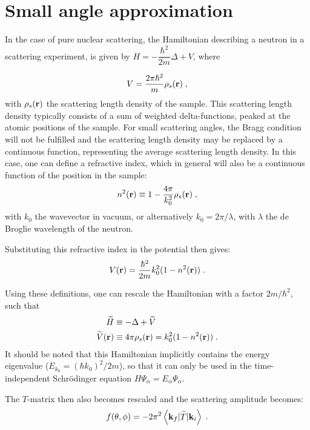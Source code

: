 \section{Small angle approximation}

In the case of pure nuclear scattering, the Hamiltonian describing a neutron in a scattering experiment, is given by $H = -\dfrac{\hbar^2}{2m}\Delta + V$, where

\begin{equation*}
  V = \frac{2\pi \hbar^2}{m}\rho_s(\mathbf{r}) \; ,
\end{equation*}
with $\rho_s(\mathbf{r})$ the scattering length density of the sample. This scattering length density typically consists of a sum of weighted delta-functions, peaked at the atomic positions of the sample. For small scattering angles, the Bragg condition will not be fulfilled and the scattering length density may be replaced by a continuous function, representing the average scattering length density. In this case, one can define a refractive index, which in general will also be a continuous function of the position in the sample:
\begin{equation*}
  n^2(\mathbf{r}) \equiv 1 - \frac{4\pi}{k_0^2}\rho_s(\mathbf{r}) \; ,
\end{equation*}
with $k_0$ the wavevector in vacuum, or alternatively $k_0 = 2\pi /\lambda$, with $\lambda$ the de Broglie wavelength of the neutron.


Substituting this refractive index in the potential then gives:
\begin{equation*}
  V(\mathbf{r}) = \frac{\hbar^2}{2m}k_0^2(1-n^2(\mathbf{r})) \; .
\end{equation*}

Using these definitions, one can rescale the Hamiltonian with a factor $2m/\hbar^2$, such that
\begin{align*}
  \widetilde{H} &\equiv -\Delta + \widetilde{V} \nonumber \\
  \widetilde{V}(\mathbf{r}) &\equiv 4\pi\rho_s(\mathbf{r}) = k_0^2(1-n^2(\mathbf{r})) \; .
\end{align*}
It should be noted that this Hamiltonian implicitly contains the energy eigenvalue ($E_{k_0}=(\hbar k_0)^2/2m$), so that it can only be used in the time-independent Schr\"odinger equation $H\Psi_\alpha = E_\alpha \Psi_\alpha$.

The $T$-matrix then also becomes rescaled and the scattering amplitude becomes:
\begin{equation*}
  f(\theta, \phi) = -2\pi^2 \left\langle \mathbf{k}_f \vert \widetilde{T} \vert \mathbf{k}_i \right\rangle \; .
\end{equation*}



